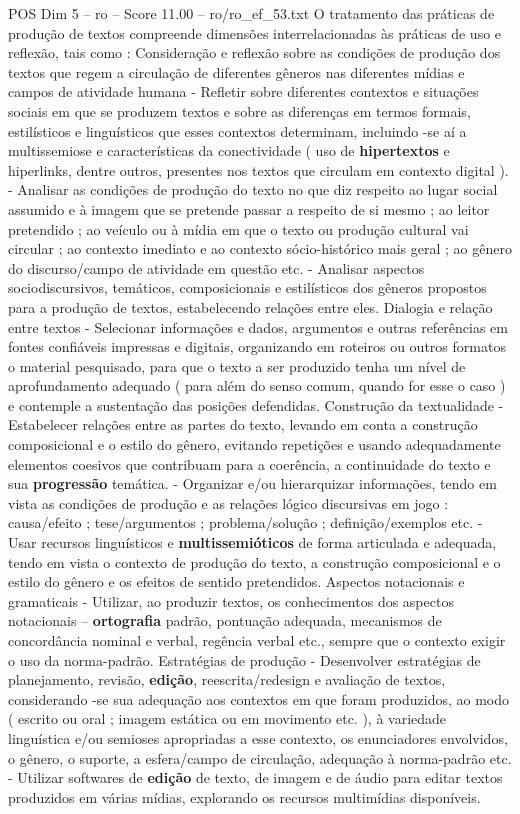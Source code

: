 \begin{textsample}{POS Dim 5 – ro – Score 11.00 – ro/ro\_ef\_53.txt}
O tratamento das práticas de produção de textos compreende dimensões interrelacionadas às práticas de uso e reflexão, tais como : Consideração e reflexão sobre as condições de produção dos textos que regem a circulação de diferentes gêneros nas diferentes mídias e campos de atividade humana - Refletir sobre diferentes contextos e situações sociais em que se produzem textos e sobre as diferenças em termos formais, estilísticos e linguísticos que esses contextos determinam, incluindo -se aí a multissemiose e características da conectividade ( uso de \textbf{hipertextos} e hiperlinks, dentre outros, presentes nos textos que circulam em contexto digital ). - Analisar as condições de produção do texto no que diz respeito ao lugar social assumido e à imagem que se pretende passar a respeito de si mesmo ; ao leitor pretendido ; ao veículo ou à mídia em que o texto ou produção cultural vai circular ; ao contexto imediato e ao contexto sócio-histórico mais geral ; ao gênero do discurso/campo de atividade em questão etc. - Analisar aspectos sociodiscursivos, temáticos, composicionais e estilísticos dos gêneros propostos para a produção de textos, estabelecendo relações entre eles.
Dialogia e relação entre textos - Selecionar informações e dados, argumentos e outras referências em fontes confiáveis impressas e digitais, organizando em roteiros ou outros formatos o material pesquisado, para que o texto a ser produzido tenha um nível de aprofundamento adequado ( para além do senso comum, quando for esse o caso ) e contemple a sustentação das posições defendidas.
Construção da textualidade - Estabelecer relações entre as partes do texto, levando em conta a construção composicional e o estilo do gênero, evitando repetições e usando adequadamente elementos coesivos que contribuam para a coerência, a continuidade do texto e sua \textbf{progressão} temática. - Organizar e/ou hierarquizar informações, tendo em vista as condições de produção e as relações lógico discursivas em jogo : causa/efeito ; tese/argumentos ; problema/solução ; definição/exemplos etc. - Usar recursos linguísticos e \textbf{multissemióticos} de forma articulada e adequada, tendo em vista o contexto de produção do texto, a construção composicional e o estilo do gênero e os efeitos de sentido pretendidos.
Aspectos notacionais e gramaticais - Utilizar, ao produzir textos, os conhecimentos dos aspectos notacionais – \textbf{ortografia} padrão, pontuação adequada, mecanismos de concordância nominal e verbal, regência verbal etc., sempre que o contexto exigir o uso da norma-padrão.
Estratégias de produção - Desenvolver estratégias de planejamento, revisão, \textbf{edição}, reescrita/redesign e avaliação de textos, considerando -se sua adequação aos contextos em que foram produzidos, ao modo ( escrito ou oral ; imagem estática ou em movimento etc. ), à variedade linguística e/ou semioses apropriadas a esse contexto, os enunciadores envolvidos, o gênero, o suporte, a esfera/campo de circulação, adequação à norma-padrão etc. - Utilizar softwares de \textbf{edição} de texto, de imagem e de áudio para editar textos produzidos em várias mídias, explorando os recursos multimídias disponíveis.

\end{textsample}
